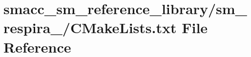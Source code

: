 \hypertarget{sm__reference__library_2sm__respira__1_2CMakeLists_8txt}{}\section{smacc\+\_\+sm\+\_\+reference\+\_\+library/sm\+\_\+respira\+\_/\+C\+Make\+Lists.txt File Reference}
\label{sm__reference__library_2sm__respira__1_2CMakeLists_8txt}
